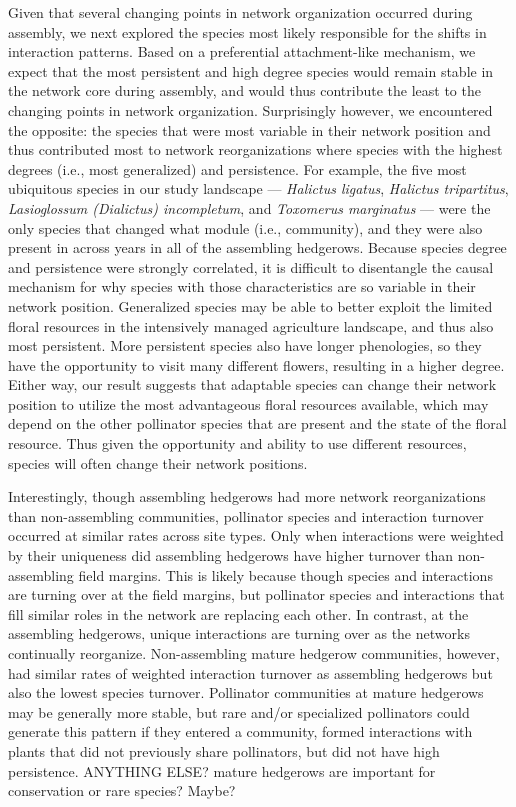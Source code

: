 \documentclass[12pt]{article}
\begin{document}
Given that several changing points in network organization occurred
during assembly, we next explored the species most likely responsible
for the shifts in interaction patterns. Based on a preferential
attachment-like mechanism, we expect that the most persistent and high
degree species would remain stable in the network core during
assembly, and would thus contribute the least to the changing points
in network organization. Surprisingly however, we encountered the
opposite: the species that were most variable in their network
position and thus contributed most to network reorganizations where
species with the highest degrees (i.e., most generalized) and
persistence. For example, the five most ubiquitous species in our
study landscape --- \textit{Halictus ligatus}, \textit{Halictus
  tripartitus}, \textit{Lasioglossum (Dialictus) incompletum}, and
\textit{Toxomerus marginatus} --- were the only species that changed
what module (i.e., community), and they were also present in across
years in all of the assembling hedgerows. Because species degree and
persistence were strongly correlated, it is difficult to disentangle
the causal mechanism for why species with those characteristics are so
variable in their network position. Generalized species may be able to
better exploit the limited floral resources in the intensively managed
agriculture landscape, and thus also most persistent. More persistent
species also have longer phenologies, so they have the opportunity to
visit many different flowers, resulting in a higher degree. Either
way, our result suggests that adaptable species can change their
network position to utilize the most advantageous floral resources
available, which may depend on the other pollinator species that are
present and the state of the floral resource. Thus given the
opportunity and ability to use different resources, species will often
change their network positions.

Interestingly, though assembling hedgerows had more network
reorganizations than non-assembling communities, pollinator species
and interaction turnover occurred at similar rates across site
types. Only when interactions were weighted by their uniqueness did
assembling hedgerows have higher turnover than non-assembling field
margins. This is likely because though species and interactions are
turning over at the field margins, but pollinator species and
interactions that fill similar roles in the network are replacing each
other. In contrast, at the assembling hedgerows, unique interactions
are turning over as the networks continually
reorganize. Non-assembling mature hedgerow communities, however, had
similar rates of weighted interaction turnover as assembling hedgerows
but also the lowest species turnover. Pollinator communities at mature
hedgerows may be generally more stable, but rare and/or specialized
pollinators could generate this pattern if they entered a community,
formed interactions with plants that did not previously share
pollinators, but did not have high persistence. ANYTHING ELSE? mature
hedgerows are important for conservation or rare species? Maybe? 
\end{document}
